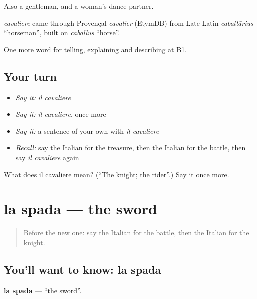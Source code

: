 Also a gentleman, and a woman's dance partner.

\begin{cousinweb}
\emph{cavaliere} came through Provençal \emph{cavalier} (EtymDB) from Late Latin \emph{caballārius} \textquotedblleft{}horseman\textquotedblright{}, built on \emph{caballus} \textquotedblleft{}horse\textquotedblright{}.
\end{cousinweb}

\begin{grammarlens}[title={What you've built}]
One more word for telling, explaining and describing at B1.
\end{grammarlens}

\subsection*{Your turn}
\begin{itemize}
\raggedright
  \item \emph{Say it:} \emph{il cavaliere}
  \item \emph{Say it:} \emph{il cavaliere}, once more
  \item \emph{Say it:} a sentence of your own with \emph{il cavaliere}
  \item \emph{Recall:} say the Italian for the treasure, then the Italian for the battle, then say \emph{il cavaliere} again
\end{itemize}

\begin{tcolorbox}[breakable,colback=teal!4,colframe=teal!35!black,title={Before you move on}]
What does il cavaliere mean? (\textquotedblleft{}The knight; the rider\textquotedblright{}.) Say it once more.
\end{tcolorbox}
\section[la spada]{la spada — the sword}

\label{lesson:IT-C327-spada}



\begin{quote}
Before the new one: say the Italian for the battle, then the Italian for the knight.
\end{quote}

\subsection*{You'll want to know: la spada}
\textbf{la spada} — \textquotedblleft{}the sword\textquotedblright{}.

